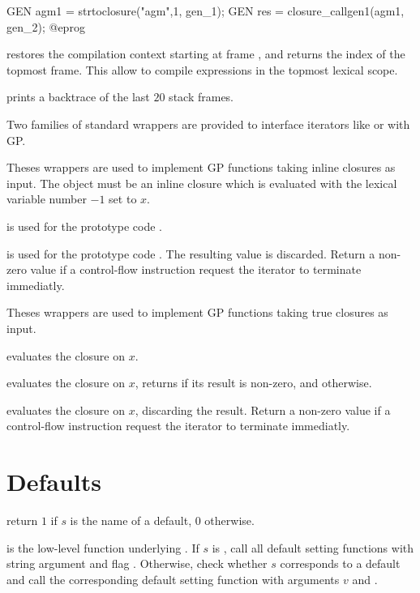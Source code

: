 \bprog
  GEN agm1 = strtoclosure("agm",1, gen_1);
  GEN res = closure_callgen1(agm1, gen_2);
@eprog

 restores the compilation context
starting at frame , and returns the index of the topmost frame.
This allow to compile expressions in the topmost lexical scope.

 prints a backtrace of the last $20$ stack frames.

Two families of standard wrappers are provided to interface iterators like 
or  with GP.

Theses wrappers are used to implement GP functions taking
inline closures as input. The object  must be an inline closure which
is evaluated with the lexical variable number $-1$ set to $x$.

 is used for the prototype code .

 is used for the prototype code .
The resulting value is discarded.  Return a non-zero value if a control-flow
instruction request the iterator to terminate immediatly.

Theses wrappers are used to implement GP functions taking
true closures as input.

 evaluates the closure  on $x$.

 evaluates the closure  on $x$,
returns  if its result is non-zero, and  otherwise.

 evaluates the closure  on $x$,
discarding the result. Return a non-zero value if a control-flow
instruction request the iterator to terminate immediatly.

\section{Defaults}

 return $1$ if $s$ is the name
of a default, $0$ otherwise.

 is the
low-level function underlying . If $s$ is , call all
default setting functions with string argument  and flag
. Otherwise, check whether $s$ corresponds to a default
and call the corresponding default setting function with arguments $v$ and
\fl.

